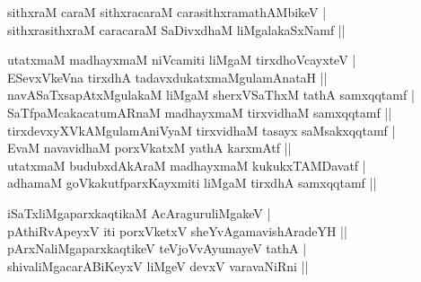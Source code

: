 \begin{entry}
\begin{shl}
sithxraM caraM sithxracaraM carasithxramathAMbikeV |\\[2pt]
sithxrasithxraM caracaraM SaDivxdhaM liMgalakaSxNamf ||\\[-1pt]
\end{shl}
\medskip
{}
\vskip 5pt
\vskip 5pt
\smallskip
\begin{shl}
utatxmaM madhayxmaM niVcamiti liMgaM tirxdhoVcayxteV |\\[2pt]
ESevxVkeVna tirxdhA tadavxdukatxmaMgulamAnataH ||\\[2pt]
navASaTxsapAtxMgulakaM liMgaM sherxVSaThxM tathA samxqqtamf |\\[2pt]
SaTfpaMcakacatumARnaM madhayxmaM tirxvidhaM samxqqtamf ||\\[2pt]
tirxdevxyXVkAMgulamAniVyaM tirxvidhaM tasayx saMsakxqqtamf |\\[2pt]
EvaM navavidhaM porxVkatxM yathA karxmAtf ||\\[2pt]
utatxmaM budubxdAkAraM madhayxmaM kukukxTAMDavatf |\\[2pt]
adhamaM goVkakutfparxKayxmiti liMgaM tirxdhA samxqqtamf ||\\[-1pt]
\end{shl}
\medskip
{}
\smallskip
{}
\smallskip
\begin{shl}
iSaTxliMgaparxkaqtikaM AcAraguruliMgakeV |\\[2pt]
pAthiRvApeyxV iti porxVketxV sheYvAgamavishAradeYH ||\\[2pt]
pArxNaliMgaparxkaqtikeV teVjoVvAyumayeV tathA |\\[2pt]
shivaliMgacarABiKeyxV liMgeV devxV varavaNiRni ||\\[2pt]

\end{shl}
\end{entry}
